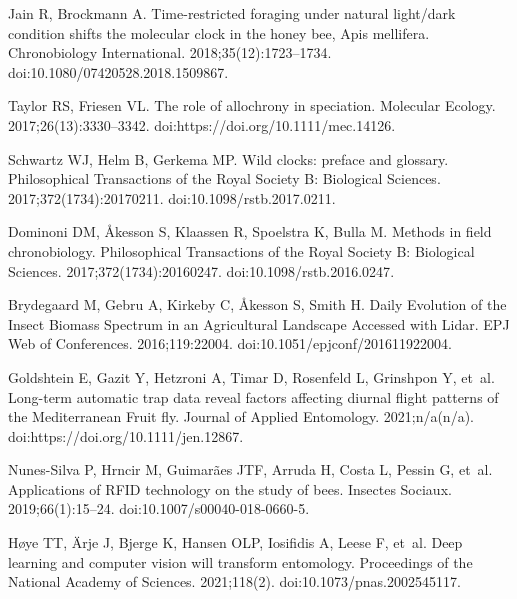 \documentclass[12pt]{article}
\begin{document}
\begin{thebibliography}{10}
	Jain R, Brockmann A.
	\newblock Time-restricted foraging under natural light/dark condition shifts
	the molecular clock in the honey bee, {Apis} mellifera.
	\newblock Chronobiology International. 2018;35(12):1723--1734.
	\newblock doi:{10.1080/07420528.2018.1509867}.
	
	Taylor RS, Friesen VL.
	\newblock The role of allochrony in speciation.
	\newblock Molecular Ecology. 2017;26(13):3330--3342.
	\newblock doi:{https://doi.org/10.1111/mec.14126}.
	
	Schwartz WJ, Helm B, Gerkema MP.
	\newblock Wild clocks: preface and glossary.
	\newblock Philosophical Transactions of the Royal Society B: Biological
	Sciences. 2017;372(1734):20170211.
	\newblock doi:{10.1098/rstb.2017.0211}.
	
	Dominoni DM, Åkesson S, Klaassen R, Spoelstra K, Bulla M.
	\newblock Methods in field chronobiology.
	\newblock Philosophical Transactions of the Royal Society B: Biological
	Sciences. 2017;372(1734):20160247.
	\newblock doi:{10.1098/rstb.2016.0247}.
	
	Brydegaard M, Gebru A, Kirkeby C, Åkesson S, Smith H.
	\newblock Daily {Evolution} of the {Insect} {Biomass} {Spectrum} in an
	{Agricultural} {Landscape} {Accessed} with {Lidar}.
	\newblock EPJ Web of Conferences. 2016;119:22004.
	\newblock doi:{10.1051/epjconf/201611922004}.
	
	Goldshtein E, Gazit Y, Hetzroni A, Timar D, Rosenfeld L, Grinshpon Y, et~al.
	\newblock Long-term automatic trap data reveal factors affecting diurnal flight
	patterns of the {Mediterranean} {Fruit} fly.
	\newblock Journal of Applied Entomology. 2021;n/a(n/a).
	\newblock doi:{https://doi.org/10.1111/jen.12867}.
	
	Nunes-Silva P, Hrncir M, Guimarães JTF, Arruda H, Costa L, Pessin G, et~al.
	\newblock Applications of {RFID} technology on the study of bees.
	\newblock Insectes Sociaux. 2019;66(1):15--24.
	\newblock doi:{10.1007/s00040-018-0660-5}.
	
	Høye TT, Ärje J, Bjerge K, Hansen OLP, Iosifidis A, Leese F, et~al.
	\newblock Deep learning and computer vision will transform entomology.
	\newblock Proceedings of the National Academy of Sciences. 2021;118(2).
	\newblock doi:{10.1073/pnas.2002545117}.
	

\end{thebibliography}
\end{document}
